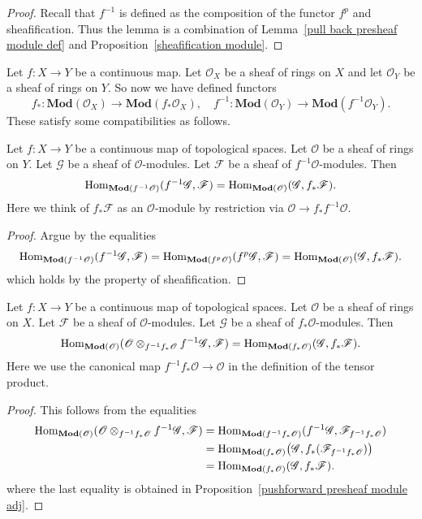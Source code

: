 \begin{proof}
Recall that $f^{-1}$ is defined as the composition of the functor $f^p$ and sheafification. Thus the lemma is a combination of Lemma~\ref{pull back presheaf module def} and Proposition~\ref{sheafification module}.
\end{proof}
Let $f:X\to Y$ be a continuous map. Let $\mathscr{O}_X$ be a sheaf of rings on $X$ and let $\mathscr{O}_Y$ be a sheaf of rings on $Y$. So now we have defined functors
\[f_*:\mathbf{Mod}(\mathscr{O}_X)\to\mathbf{Mod}(f_*\mathscr{O}_X),\quad f^{-1}:\mathbf{Mod}(\mathscr{O}_Y)\to\mathbf{Mod}(f^{-1}\mathscr{O}_Y).\]
These satisfy some compatibilities as follows.
\begin{proposition}\label{pull back module sheaf adj}
Let $f:X\to Y$ be a continuous map of topological spaces. Let $\mathscr{O}$ be a sheaf of rings on $Y$. Let $\mathscr{G}$ be a sheaf of $\mathscr{O}$-modules. Let $\mathscr{F}$ be a sheaf of $f^{-1}\mathscr{O}$-modules. Then
\[\mathrm{Hom}_{\mathbf{Mod}(f^{-1}\mathscr{O})}(f^{-1}\mathscr{G},\mathscr{F})=\mathrm{Hom}_{\mathbf{Mod}(\mathscr{O})}(\mathscr{G},f_*\mathscr{F}).\]
Here we think of $f_*\mathscr{F}$ as an $\mathscr{O}$-module by restriction via $\mathscr{O}\to f_*f^{-1}\mathscr{O}$.
\end{proposition}
\begin{proof}
Argue by the equalities
\[\mathrm{Hom}_{\mathbf{Mod}(f^{-1}\mathscr{O})}(f^{-1}\mathscr{G},\mathscr{F})=\mathrm{Hom}_{\mathbf{Mod}(f^{p}\mathscr{O})}(f^{p}\mathscr{G},\mathscr{F})=\mathrm{Hom}_{\mathbf{Mod}(\mathscr{O})}(\mathscr{G},f_*\mathscr{F}).\]
which holds by the property of sheafification.
\end{proof}
\begin{proposition}\label{push module sheaf adj}
Let $f:X\to Y$ be a continuous map of topological spaces. Let $\mathscr{O}$ be a sheaf of rings on $X$. Let $\mathscr{F}$ be a sheaf of $\mathscr{O}$-modules. Let $\mathscr{G}$ be a sheaf of $f_*\mathscr{O}$-modules. Then
\[\mathrm{Hom}_{\mathbf{Mod}(\mathscr{O})}(\mathscr{O}\otimes_{f^{-1}f_*\mathscr{O}}f^{-1}\mathscr{G},\mathscr{F})=\mathrm{Hom}_{\mathbf{Mod}(f_*\mathscr{O})}(\mathscr{G},f_*\mathscr{F}).\]
Here we use the canonical map $f^{-1}f_*\mathscr{O}\to\mathscr{O}$ in the definition of the tensor product.
\end{proposition}
\begin{proof}
This follows from the equalities
\begin{align*}
\mathrm{Hom}_{\mathbf{Mod}(\mathscr{O})}(\mathscr{O}\otimes_{f^{-1}f_*\mathscr{O}}f^{-1}\mathscr{G},\mathscr{F})&=\mathrm{Hom}_{\mathbf{Mod}(f^{-1}f_*\mathscr{O})}(f^{-1}\mathscr{G},\mathscr{F}_{f^{-1}f_*\mathscr{O}})\\
&=\mathrm{Hom}_{\mathbf{Mod}(f_*\mathscr{O})}\big(\mathscr{G},f_*(\mathscr{F}_{f^{-1}f_*\mathscr{O}})\big)\\
&=\mathrm{Hom}_{\mathbf{Mod}(f_*\mathscr{O})}(\mathscr{G},f_*\mathscr{F}).
\end{align*}
where the last equality is obtained in Proposition~\ref{pushforward presheaf module adj}.
\end{proof}

